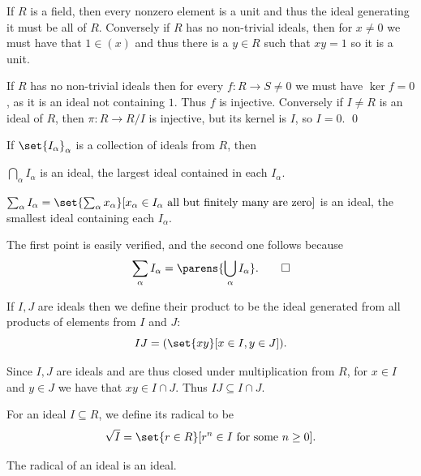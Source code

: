 \eprop

\bproof

    If $R$ is a field, then every nonzero element is a unit and thus the ideal generating it must be all of $R$.
    Conversely if $R$ has no non-trivial ideals, then for $x\neq0$ we must have that $1\in(x)$ and thus there is a $y\in R$ such that $xy=1$ so it is a unit.

    If $R$ has no non-trivial ideals then for every $f\colon R\to S\neq0$ we must have $\ker f=0$, as it is an ideal not containing $1$.
    Thus $f$ is injective.
    Conversely if $I\neq R$ is an ideal of $R$, then $\pi\colon R\to R/I$ is injective, but its kernel is $I$, so $I=0$.
    \qed

\eproof

\bprop

    If $\set{I_\alpha}_\alpha$ is a collection of ideals from $R$, then
    \benum
        \item $\bigcap_\alpha I_\alpha$ is an ideal, the largest ideal contained in each $I_\alpha$.
        \item $\sum_\alpha I_\alpha=\set{\sum_\alpha x_\alpha}[x_\alpha\in I_\alpha\hbox{ all but finitely many are zero}]$ is an ideal, the smallest ideal containing each $I_\alpha$.
    \eenum

\eprop

\bproof

    The first point is easily verified, and the second one follows because
    $$ \sum_\alpha I_\alpha = \parens{\bigcup_\alpha I_\alpha} . \qed $$

\eproof

\bdefn

    If $I,J$ are ideals then we define their {\emphcolor product} to be the ideal generated from all products of elements from $I$ and $J$:
    $$ IJ = (\set{xy}[x\in I,y\in J]) . $$

\edefn

Since $I,J$ are ideals and are thus closed under multiplication from $R$, for $x\in I$ and $y\in J$ we have that $xy\in I\cap J$.
Thus $IJ\subseteq I\cap J$.

\bdefn

    For an ideal $I\subseteq R$, we define its {\emphcolor radical} to be
    $$ \sqrt I = \set{r\in R}[r^n\in I\hbox{ for some $n\geq0$}] . $$

\edefn

\blemm

    The radical of an ideal is an ideal.

